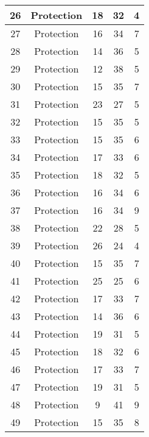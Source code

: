 \documentclass[results.tex]{subfiles}
\begin{document}
\begin{center}
\begin{tabular}{| c || c | c | c | c |}
    \hline
    26 & Protection & 18 & 32 & 4 \\ 
    \hline
    27 & Protection & 16 & 34 & 7 \\ 
    \hline
    28 & Protection & 14 & 36 & 5 \\ 
    \hline
    29 & Protection & 12 & 38 & 5 \\ 
    \hline
    30 & Protection & 15 & 35 & 7 \\ 
    \hline
    31 & Protection & 23 & 27 & 5 \\ 
    \hline
    32 & Protection & 15 & 35 & 5 \\ 
    \hline
    33 & Protection & 15 & 35 & 6 \\ 
    \hline
    34 & Protection & 17 & 33 & 6 \\ 
    \hline
    35 & Protection & 18 & 32 & 5 \\ 
    \hline
    36 & Protection & 16 & 34 & 6 \\ 
    \hline
    37 & Protection & 16 & 34 & 9 \\ 
    \hline
    38 & Protection & 22 & 28 & 5 \\ 
    \hline
    39 & Protection & 26 & 24 & 4 \\ 
    \hline
    40 & Protection & 15 & 35 & 7 \\ 
    \hline
    41 & Protection & 25 & 25 & 6 \\ 
    \hline
    42 & Protection & 17 & 33 & 7 \\ 
    \hline
    43 & Protection & 14 & 36 & 6 \\ 
    \hline
    44 & Protection & 19 & 31 & 5 \\ 
    \hline
    45 & Protection & 18 & 32 & 6 \\ 
    \hline
    46 & Protection & 17 & 33 & 7 \\ 
    \hline
    47 & Protection & 19 & 31 & 5 \\ 
    \hline
    48 & Protection & 9 & 41 & 9 \\ 
    \hline
    49 & Protection & 15 & 35 & 8 \\ 
    \hline   \end{tabular}
\end{center}
\end{document}
